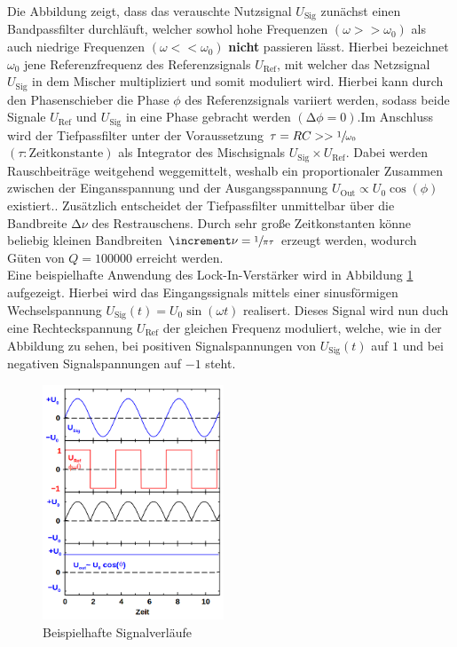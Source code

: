 \noindent Die Abbildung zeigt, dass das verauschte Nutzsignal $U_\text{Sig}$ zunächst einen Bandpassfilter durchläuft,
welcher sowhol hohe Frequenzen $\left(\omega >> \omega_0\right)$ als auch niedrige Frequenzen $\left(\omega << \omega_0\right)$
\textbf{nicht} passieren lässt. Hierbei bezeichnet $\omega_0$ jene Referenzfrequenz des Referenzsignals $U_\text{Ref}$, mit welcher 
das Netzsignal $U_\text{Sig}$ in dem Mischer multipliziert und somit moduliert wird. Hierbei kann durch den Phasenschieber die Phase  
$\phi$ des Referenzsignals variiert werden, sodass beide Signale $U_\text{Ref}$ und $U_\text{Sig}$ in eine Phase gebracht werden 
$\left(\increment \phi = 0\right)$.Im Anschluss wird der Tiefpassfilter unter der Voraussetzung $\tau = RC >> \sfrac{1}{\omega_0}$ 
$\left(\tau: \text{Zeitkonstante}\right)$ als Integrator des Mischsignals $U_\text{Sig} \times U_\text{Ref}$. Dabei werden 
Rauschbeiträge weitgehend weggemittelt, weshalb ein proportionaler Zusammen zwischen der Eingansspannung und der Ausgangsspannung $U_\text{Out} \propto U_0\cos(\phi)$ existiert.. 
Zusätzlich entscheidet der Tiefpassfilter unmittelbar über die Bandbreite $\increment\nu$ des
Restrauschens. Durch sehr große Zeitkonstanten könne beliebig kleinen Bandbreiten $\increment\nu = \sfrac{1}{\pi\tau}$ erzeugt werden,
wodurch Güten von $Q = 100000$ erreicht werden.\\
Eine beispielhafte Anwendung des Lock-In-Verstärker wird in Abbildung \ref{fig:AWD} aufgezeigt. Hierbei wird das Eingangssignals 
mittels einer sinusförmigen Wechselspannung $U_\text{Sig}(t) = U_{0}\sin(\omega t)$ realisert. Dieses Signal wird nun duch eine
Rechteckspannung $U_\text{Ref}$ der gleichen Frequenz moduliert, welche, wie in der Abbildung zu sehen, bei positiven Signalspannungen
von $U_\text{Sig}(t)$ auf $1$ und bei negativen Signalspannungen auf $-1$ steht.

\begin{figure}
    \centering
    \includegraphics[height=7cm]{AWD.png}
    \caption{Beispielhafte Signalverläufe}
    \label{fig:AWD}
\end{figure}

